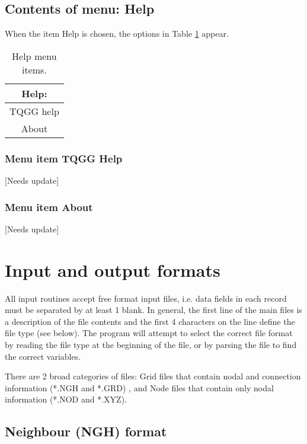 \documentclass{article}
\begin{document}
\subsection{Contents of menu: Help}
When the item Help is chosen, the options in Table \ref{tab:HELP} appear.

\begin{table}[htb!]
 \caption{Help menu items.}
  \begin{center}
   \begin{tabular}{|c|}
    \hline
Help:\\     \hline
TQGG help \\
About \\
    \hline
   \end{tabular}
   \label{tab:HELP}
  \end{center}
\end{table}


\subsubsection[Menu item TQGG Help]{Menu item TQGG Help}
[Needs update]

\subsubsection[Menu item About]{Menu item About}
[Needs update]



\section{Input and output formats} \label{sec:formats}

All input routines accept free format input files, i.e. data fields in each record must be separated by at least 1 blank.
In general, the first line of the main files is a description of the file contents and the first 4 characters
on the line define the file type (see below). The program will attempt to select the correct file format
by reading the file type at the beginning of the file, or by parsing the file to find the correct variables.

There are 2 broad categories of files: Grid files that contain nodal and connection information (*.NGH and *.GRD)
, and Node files that contain only nodal information (*.NOD and *.XYZ). 

\newpage
\subsection[Neighbour (NGH) format]{Neighbour (NGH) format}
\end{document}
